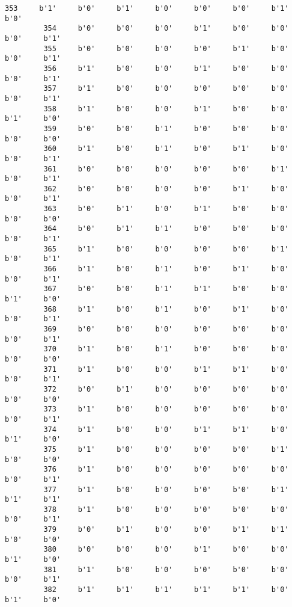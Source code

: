 \documentclass[11pt]{article}
\begin{document}
\begin{Verbatim}[commandchars=\\\{\}]
         353     b'1'     b'0'     b'1'     b'0'     b'0'     b'0'     b'1'     b'0'   
         354     b'0'     b'0'     b'0'     b'1'     b'0'     b'0'     b'0'     b'1'   
         355     b'0'     b'0'     b'0'     b'0'     b'1'     b'0'     b'0'     b'1'   
         356     b'1'     b'0'     b'0'     b'1'     b'0'     b'0'     b'0'     b'1'   
         357     b'1'     b'0'     b'0'     b'0'     b'0'     b'0'     b'0'     b'1'   
         358     b'1'     b'0'     b'0'     b'1'     b'0'     b'0'     b'1'     b'0'   
         359     b'0'     b'0'     b'1'     b'0'     b'0'     b'0'     b'0'     b'0'   
         360     b'1'     b'0'     b'1'     b'0'     b'1'     b'0'     b'0'     b'1'   
         361     b'0'     b'0'     b'0'     b'0'     b'0'     b'1'     b'0'     b'1'   
         362     b'0'     b'0'     b'0'     b'0'     b'1'     b'0'     b'0'     b'1'   
         363     b'0'     b'1'     b'0'     b'1'     b'0'     b'0'     b'0'     b'0'   
         364     b'0'     b'1'     b'1'     b'0'     b'0'     b'0'     b'0'     b'1'   
         365     b'1'     b'0'     b'0'     b'0'     b'0'     b'1'     b'0'     b'1'   
         366     b'1'     b'0'     b'1'     b'0'     b'1'     b'0'     b'0'     b'1'   
         367     b'0'     b'0'     b'1'     b'1'     b'0'     b'0'     b'1'     b'0'   
         368     b'1'     b'0'     b'1'     b'0'     b'1'     b'0'     b'0'     b'1'   
         369     b'0'     b'0'     b'0'     b'0'     b'0'     b'0'     b'0'     b'1'   
         370     b'1'     b'0'     b'1'     b'0'     b'0'     b'0'     b'0'     b'0'   
         371     b'1'     b'0'     b'0'     b'1'     b'1'     b'0'     b'0'     b'1'   
         372     b'0'     b'1'     b'0'     b'0'     b'0'     b'0'     b'0'     b'0'   
         373     b'1'     b'0'     b'0'     b'0'     b'0'     b'0'     b'0'     b'1'   
         374     b'1'     b'0'     b'0'     b'1'     b'1'     b'0'     b'1'     b'0'   
         375     b'1'     b'0'     b'0'     b'0'     b'0'     b'1'     b'0'     b'0'   
         376     b'1'     b'0'     b'0'     b'0'     b'0'     b'0'     b'0'     b'1'   
         377     b'1'     b'0'     b'0'     b'0'     b'0'     b'1'     b'1'     b'1'   
         378     b'1'     b'0'     b'0'     b'0'     b'0'     b'0'     b'0'     b'1'   
         379     b'0'     b'1'     b'0'     b'0'     b'1'     b'1'     b'0'     b'0'   
         380     b'0'     b'0'     b'0'     b'1'     b'0'     b'0'     b'1'     b'0'   
         381     b'1'     b'0'     b'0'     b'0'     b'0'     b'0'     b'0'     b'1'   
         382     b'1'     b'1'     b'1'     b'1'     b'1'     b'0'     b'1'     b'0'   

\end{Verbatim}
\end{document}
